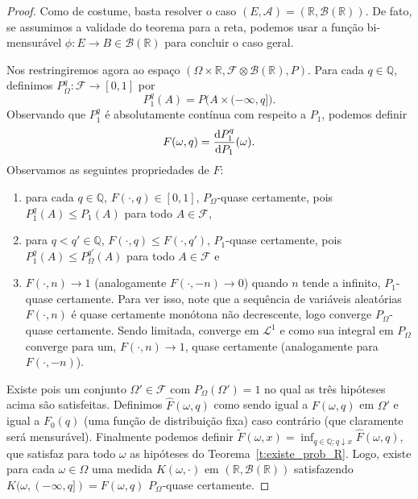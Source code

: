 \begin{proof}
  Como de costume, basta resolver o caso $(E, \mathcal{A}) = (\mathbb{R}, \mathcal{B}(\mathbb{R}))$.
  De fato, se assumimos a validade do teorema para a reta, podemos usar a função bi-mensurável $\phi: E \to B \in \mathcal{B}(\mathbb{R})$ para concluir o caso geral.

  Nos restringiremos agora ao espaço $(\Omega \times \mathbb{R}, \mathcal{F} \otimes \mathcal{B}(\mathbb{R}), P)$.
  Para cada $q \in \mathbb{Q}$, definimos $P^q_\Omega : \mathcal{F} \to [0,1]$ por
  \begin{equation}
    P^q_1 (A) = P\big(  A  \times (-\infty, q]\big).
  \end{equation}
  Observando que $P^q_1$ é absolutamente contínua com respeito a $P_1$, podemos definir
  \begin{equation}
    F(\omega, q) = \frac{\mathop{}\!\mathrm{d} P^q_1}{\mathop{}\!\mathrm{d} P_1}(\omega).
  \end{equation}
  Observamos as seguintes propriedades de $F$:
  \begin{enumerate}[\quad a)]
  \item para cada $q \in \mathbb{Q}$, $F(\cdot, q) \in [0,1]$, $P_\Omega$-quase certamente, pois $P^q_1(A) \leq P_1(A)$ para todo $A \in \mathcal{F}$,
  \item para $q < q' \in \mathbb{Q}$, $F(\cdot, q) \leq F(\cdot, q')$, $P_1$-quase certamente, pois $P^q_1(A) \leq P^{q'}_\Omega(A)$ para todo $A \in \mathcal{F}$ e
  \item $F(\cdot, n) \to 1$ (analogamente $F(\cdot, -n) \to 0$) quando $n$ tende a infinito, $P_1$-quase certamente.
    Para ver isso, note que a sequência de variáveis aleatórias $F(\cdot, n)$ é quase certamente monótona não decrescente, logo converge $P_\Omega$-quase certamente.
    Sendo limitada, converge em $\mathcal{L}^1$ e como sua integral em $P_\Omega$ converge para um, $F(\cdot, n) \to 1$, quase certamente (analogamente para $F(\cdot, -n)$).
  \end{enumerate}
  Existe pois um conjunto $\Omega' \in \mathcal{F}$ com $P_\Omega(\Omega') = 1$ no qual as três hipóteses acima são satisfeitas.
  Definimos $\hat{F}(\omega, q)$ como sendo igual a $F(\omega, q)$ em $\Omega'$ e igual a $F_0(q)$ (uma função de distribuição fixa) caso contrário (que claramente será mensurável).
  Finalmente podemos definir $\tilde{F}(\omega, x) = \inf_{q \in \mathbb{Q}; q \downarrow x} \hat{F}(\omega, q)$, que satisfaz para todo $\omega$ as hipóteses do Teorema~\ref{t:existe_prob_R}.
  Logo, existe para cada $\omega \in \Omega$ uma medida $K(\omega, \cdot)$ em $(\mathbb{R}, \mathcal{B}(\mathbb{R}))$ satisfazendo $K(\omega,(-\infty, q]) = F(\omega, q)$ $P_\Omega$-quase certamente.


\end{proof}
